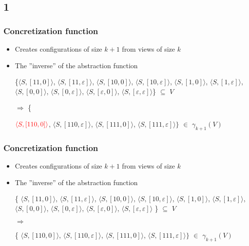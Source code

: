 \documentclass[handout]{beamer}
\begin{document}
\subsection*{1}
\begin{frame}
  \frametitle{Concretization function}
  \begin{itemize}
  \item
    Creates configurations of size $k+1$ from views of size $k$
  \item
    The ''inverse'' of the abstraction function

    \begin{example}[$\gamma$ for ABP with $k=2$]


    \{$\langle S, [11, 0]\rangle$, $\langle S, [11, \varepsilon]\rangle$, $\langle S, [10, 0]\rangle$, $\langle S, [10, \varepsilon]\rangle$, $\langle S, [1, 0]\rangle$, $\langle S, [1,\varepsilon ]\rangle$, $\langle S,[0,0]\rangle$, $\langle S, [0,\varepsilon]\rangle$, $\langle S, [\varepsilon, 0]\rangle$, $\langle S, [\varepsilon, \varepsilon]\rangle$\} $\subseteq$ $V$

  $\Rightarrow$ \{

${\color{red}\langle S, [110,0]\rangle}$,
  $\langle S, [110,\varepsilon]\rangle$,
$\langle S, [111,0]\rangle$,
$\langle S, [111,\varepsilon]\rangle\}$
$\in$ $\gamma_{k+1}(V)$
    \end{example}
  \end{itemize}
\end{frame}

\begin{frame}
  \frametitle{Concretization function}
  \begin{itemize}
  \item
    Creates configurations of size $k+1$ from views of size $k$
  \item
    The ''inverse'' of the abstraction function

    \begin{example}[$\gamma$ for ABP with $k=2$]

    \{
    $\langle S, [11, 0]\rangle$,
    {\color{red}$\langle S, [11, \varepsilon]\rangle$},
    $\langle S, [10, 0]\rangle$,
    {\color{red}$\langle S, [10, \varepsilon]\rangle$},
    $\langle S, [1, 0]\rangle$,
    {\color{red}$\langle S, [1,\varepsilon ]\rangle$},
    $\langle S,[0,0]\rangle$,
    {\color{red}$\langle S, [0,\varepsilon]\rangle$},
    $\langle S, [\varepsilon, 0]\rangle$,
    {\color{red}$\langle S, [\varepsilon, \varepsilon]\rangle$}
    \} $\subseteq$ $V$

    $\Rightarrow$

    \{
    $\langle S, [110,0]\rangle$,
    {\color{red}$\langle S, [110,\varepsilon]\rangle$},
    $\langle S, [111,0]\rangle$,
    $\langle S, [111,\varepsilon]\rangle\}$
    $\in$ $\gamma_{k+1}(V)$
    \end{example}
  \end{itemize}
\end{frame}
\end{document}
